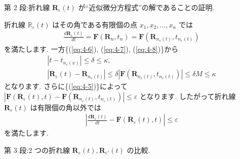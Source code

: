 \documentclass[openany, a4paper, oneside]{book}
\theoremstyle{break}
\theoremstyle{breakdefn}
\newcommand{\abs}[1]{\left|#1\right|}
\newcommand{\bbR}{\mathbb{R}}
\newcommand{\vep}{\varepsilon}
\begin{document}
第 2 段:折れ線 $\bm{R}_{\vep} (t)$ が``近似微分方程式''の解であることの証明.

折れ線 $\bbR_{\vep}(t)$ はその角である有限個の点 $x_1, x_2 ,\dots,x_n$ では
\begin{gather}
\frac{d \bm{R}_{\vep} ( t ) } {dt}
=
\bm{F} ( \bm{R}_n , t_n )
=
\bm{F} ( \bm{R}_{ n_{\vep} ( t ) } , t_{ n_{\vep} (t) } )
\end{gather}
を満たします.
一方\{(\ref{eq:4-6}), (\ref{eq:4-7}), (\ref{eq:4-8})\}から
\begin{gather}
\abs{t - t_{n_{\vep} (x)}}
\leq
\delta
\leq
\kappa
, \\
\abs{\bm{R}_{\vep} (t) - \bm{R}_{ n_{\vep} (t) }}
\leq
\delta | \bm{F} ( \bm{R}_{ n_{\vep} (t) } , t_{ n_{\vep} (t) } ) |
\leq
\delta M
\leq
\kappa
\end{gather}
となります.
さらに\{(\ref{eq:4-5})\}によって
$| \bm{F} ( \bm{R}_{\vep} (t) , t ) - \bm{F} ( \bm{R}_{ n_{\vep} ( t ) } , t_{ n_{\vep} (t) } ) | \leq \vep$
となります.
したがって折れ線 $\bm{R}_{\vep} (t)$ は有限個の角以外では
\begin{gather}
\left | \frac{ d \bm{R}_{\vep} ( t ) } {dt} - \bm{F} ( \bm{R}_{\vep} (t) , t )  \right|
\leq
\vep
\label{eq:4-9}
\end{gather}
を満たします.

第 3 段:2 つの折れ線 $\bm{R}_{\vep}(t),\bm{R}_{\vep '}(t)$ の比較.
\end{document}
